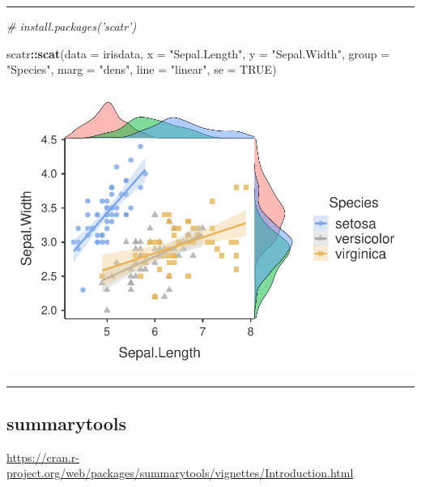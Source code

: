 \documentclass[]{article}
\newenvironment{Shaded}{\begin{snugshade}}{\end{snugshade}}
\newcommand{\CommentTok}[1]{\textcolor[rgb]{0.56,0.35,0.01}{\textit{#1}}}
\newcommand{\DataTypeTok}[1]{\textcolor[rgb]{0.13,0.29,0.53}{#1}}
\newcommand{\KeywordTok}[1]{\textcolor[rgb]{0.13,0.29,0.53}{\textbf{#1}}}
\newcommand{\NormalTok}[1]{#1}
\newcommand{\OperatorTok}[1]{\textcolor[rgb]{0.81,0.36,0.00}{\textbf{#1}}}
\newcommand{\OtherTok}[1]{\textcolor[rgb]{0.56,0.35,0.01}{#1}}
\newcommand{\StringTok}[1]{\textcolor[rgb]{0.31,0.60,0.02}{#1}}
\begin{document}
\begin{center}\rule{0.5\linewidth}{\linethickness}\end{center}

\begin{Shaded}
\begin{Highlighting}[]
\CommentTok{# install.packages('scatr')}

\NormalTok{scatr}\OperatorTok{::}\KeywordTok{scat}\NormalTok{(}\DataTypeTok{data =}\NormalTok{ irisdata, }\DataTypeTok{x =} \StringTok{"Sepal.Length"}\NormalTok{, }\DataTypeTok{y =} \StringTok{"Sepal.Width"}\NormalTok{, }\DataTypeTok{group =} \StringTok{"Species"}\NormalTok{, }
    \DataTypeTok{marg =} \StringTok{"dens"}\NormalTok{, }\DataTypeTok{line =} \StringTok{"linear"}\NormalTok{, }\DataTypeTok{se =} \OtherTok{TRUE}\NormalTok{)}
\end{Highlighting}
\end{Shaded}

\includegraphics{R-Giris_files/figure-latex/scatter-1.pdf}

\begin{center}\rule{0.5\linewidth}{\linethickness}\end{center}

\hypertarget{summarytools}{%
\subsection{summarytools}\label{summarytools}}

\url{https://cran.r-project.org/web/packages/summarytools/vignettes/Introduction.html}

\begin{Shaded}
\end{Shaded}
\end{document}
